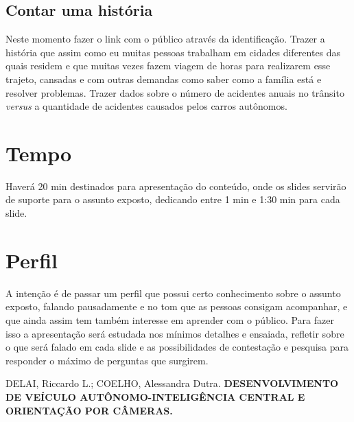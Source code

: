 \documentclass[12pt,a4paper]{article}
\begin{document}
    \subsection{Contar uma história}
    \par Neste momento fazer o link com o público através da identificação. Trazer a história que assim como eu muitas pessoas trabalham em cidades diferentes das quais residem e que muitas vezes fazem viagem de horas para realizarem esse trajeto, cansadas e com outras demandas como saber como a família está e resolver problemas. Trazer dados sobre o número de acidentes anuais no trânsito \textit{versus} a quantidade de acidentes causados pelos carros autônomos.


    \section{Tempo}
    \par Haverá 20 min destinados para apresentação do conteúdo, onde os slides servirão de suporte para o assunto exposto, dedicando entre 1 min e 1:30 min para cada slide.  
    
    \section{Perfil}
    \par A intenção é de passar um perfil que possui certo conhecimento sobre o assunto exposto, falando pausadamente e no tom que as pessoas consigam acompanhar, e que ainda assim tem também interesse em aprender com o público. Para fazer isso a apresentação será estudada nos mínimos detalhes e ensaiada, refletir sobre o que será falado em cada slide e as possibilidades de contestação e pesquisa para responder o máximo de perguntas que surgirem.


     
    \begin{thebibliography}{BIBLIOGRAFIA}
 
         DELAI, Riccardo L.; COELHO, Alessandra Dutra. \textbf{DESENVOLVIMENTO DE VEÍCULO AUTÔNOMO-INTELIGÊNCIA CENTRAL E ORIENTAÇÃO POR CÂMERAS.}
    
    \end{thebibliography}


\end{document}
